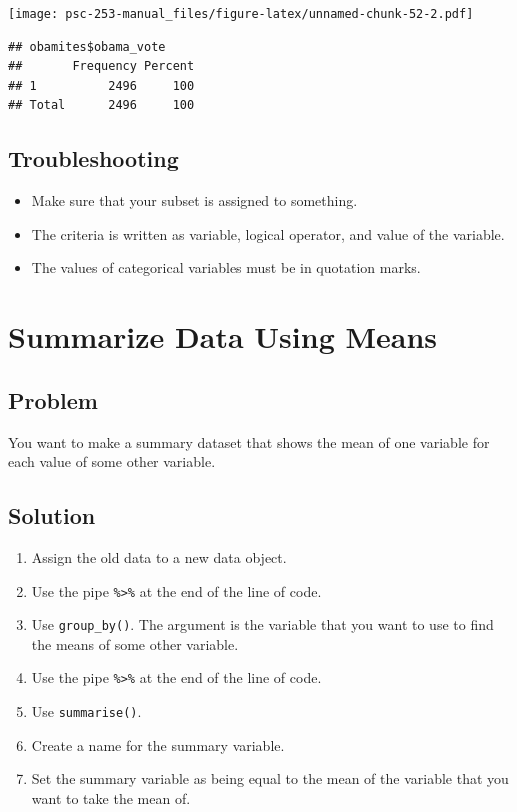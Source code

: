 \documentclass[
]{book}
\providecommand{\tightlist}{%
  \setlength{\itemsep}{0pt}\setlength{\parskip}{0pt}}
\begin{document}
\texttt{[image: psc-253-manual\_files/figure-latex/unnamed-chunk-52-2.pdf]}

\begin{verbatim}
## obamites$obama_vote 
##       Frequency Percent
## 1          2496     100
## Total      2496     100
\end{verbatim}

\hypertarget{troubleshooting-17}{%
\subsection{Troubleshooting}\label{troubleshooting-17}}

\begin{itemize}
\tightlist
\item
  Make sure that your subset is assigned to something.
\item
  The criteria is written as variable, logical operator, and value of the variable.
\item
  The values of categorical variables must be in quotation marks.
\end{itemize}

\hypertarget{sum}{%
\section{Summarize Data Using Means}\label{sum}}

\hypertarget{problem-22}{%
\subsection{Problem}\label{problem-22}}

You want to make a summary dataset that shows the mean of one variable for each value of some other variable.

\hypertarget{solution-20}{%
\subsection{Solution}\label{solution-20}}

\begin{enumerate}
\def\labelenumi{\arabic{enumi}.}
\tightlist
\item
  Assign the old data to a new data object.
\item
  Use the pipe \texttt{\%\textgreater{}\%} at the end of the line of code.
\item
  Use \texttt{group\_by()}. The argument is the variable that you want to use to find the means of some other variable.
\item
  Use the pipe \texttt{\%\textgreater{}\%} at the end of the line of code.
\item
  Use \texttt{summarise()}.
\item
  Create a name for the summary variable.
\item
  Set the summary variable as being equal to the mean of the variable that you want to take the mean of.
\end{enumerate}
\end{document}
